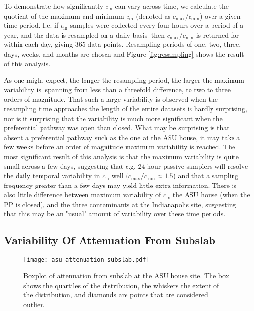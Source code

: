 \documentclass[journal=esthag,manuscript=article]{achemso}
\begin{document}
To demonstrate how significantly $c_\mathrm{in}$ can vary across time, we calculate the quotient of the maximum and minimum $c_\mathrm{in}$ (denoted as $c_\mathrm{max}/c_\mathrm{min}$) over a given time period.
I.e. if $c_\mathrm{in}$ samples were collected every four hours over a period of a year, and the data is resampled on a daily basis, then $c_\mathrm{max}/c_\mathrm{min}$ is returned for within each day, giving 365 data points.
Resampling periods of one, two, three, days, weeks, and months are chosen and Figure \ref{fig:resampling} shows the result of this analysis.

As one might expect, the longer the resampling period, the larger the maximum variability is: spanning from less than a threefold difference, to two to three orders of magnitude.
That such a large variability is observed when the resampling time approaches the length of the entire datasets is hardly surprising, nor is it surprising that the variability is much more significant when the preferential pathway was open than closed.
What may be surprising is that absent a preferential pathway such as the one at the ASU house, it may take a few weeks before an order of magnitude maximum variability is reached.
The most significant result of this analysis is that the maximum variability is quite small across a few days, suggesting that e.g. 24-hour passive samplers will resolve the daily temporal variability in $c_\mathrm{in}$ well ($c_\mathrm{max}/c_\mathrm{min} \approx 1.5$) and that a sampling frequency greater than a few days may yield little extra information.
There is also little difference between maximum variability of $c_\mathrm{in}$ the ASU house (when the PP is closed), and the three contaminants at the Indianapolis site, suggesting that this may be an "usual" amount of variability over these time periods.

\subsection{Variability Of Attenuation From Subslab}

\begin{figure}[htb!]
  \caption{Boxplot of attenuation from subslab at the ASU house site. The box shows the quartiles of the distribution, the whiskers the extent of the distribution, and diamonds are points that are considered outlier.}\label{fig:attenuation_subslab}
  \texttt{[image: asu\_attenuation\_subslab.pdf]}
\end{figure}
\end{document}
